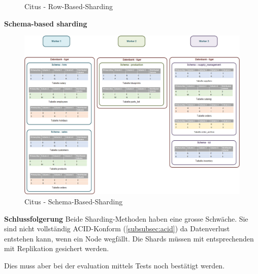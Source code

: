 \begin{flushleft}
\begin{flushleft}
\begin{flushleft}
\begin{figure}[H]
                \caption{Citus - Row-Based-Sharding}
                \label{fig:citus_row-based-sharding}
            \end{figure}
        \end{flushleft}
        \begin{flushleft}
            \textbf{Schema-based sharding}
            \begin{figure}[H]
                \centering
                \includegraphics[width=0.8\linewidth]{source/implementation/evaluation/postgresql_ha_solutions/stackgres/citus_schema-based-sharding}
                \caption{Citus - Schema-Based-Sharding}
                \label{fig:citus_schema-based-sharding}
            \end{figure}
        \end{flushleft}
        \begin{flushleft}
            \textbf{Schlussfolgerung}
            Beide Sharding-Methoden haben eine grosse Schwäche.
            Sie sind nicht vollständig ACID-Konform (\autoref{subsubsec:acid}) da Datenverlust entstehen kann, wenn ein Node wegfällt.
            Die Shards müssen mit entsprechenden mit Replikation gesichert werden\cite{4GDXA49I}.

            Dies muss aber bei der evaluation mittels Tests noch bestätigt werden.
        \end{flushleft}
    \end{flushleft}
\end{flushleft}
